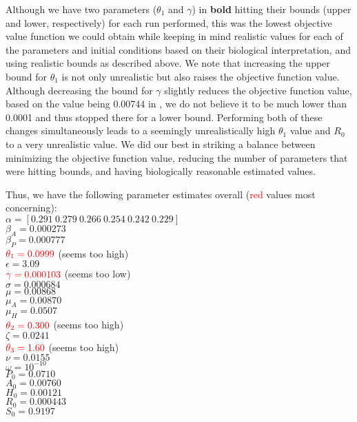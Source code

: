 \documentclass[12pt]{article}
\begin{document}
Although we have two parameters ($\theta_1$ and $\gamma$) in \textbf{bold} hitting their bounds (upper and lower, respectively) for each run performed, this was the lowest objective value function we could obtain while keeping in mind realistic values for each of the parameters and initial conditions based on their biological interpretation, and using realistic bounds as described above. We note that increasing the upper bound for $\theta_1$ is not only unrealistic but also raises the objective function value. Although decreasing the bound for $\gamma$ slightly reduces the objective function value, based on the value being 0.00744 in \cite{Battista}, we do not believe it to be much lower than 0.0001 and thus stopped there for a lower bound. Performing both of these changes simultaneously leads to a seemingly unrealistically high $\theta_1$ value and $R_0$ to a very unrealistic value. We did our best in striking a balance between minimizing the objective function value, reducing the number of parameters that were hitting bounds, and having biologically reasonable estimated values. 

Thus, we have the following parameter estimates overall (\textcolor{red}{red} values most concerning): \\
$\alpha=[0.291  \   0.279  \   0.266    \   0.254 \    0.242    \     0.229   ]$ \\
$\beta_A=0.000273$ \\
$\beta_P=0.000777$ \\
$\textcolor{red}{\theta_1=0.0999}$ (seems too high)\\
$\epsilon=3.09$ \\
$\textcolor{red}{\gamma=0.000103}$ (seems too low) \\
$\sigma=0.000684$ \\
$\mu=0.00868$ \\
$\mu_{A}=0.00870$ \\
$\mu_{H}=0.0507$ \\
$\textcolor{red}{\theta_2=0.300}$ (seems too high) \\
$\zeta=0.0241$ \\
$\textcolor{red}{\theta_3=1.60}$ (seems too high) \\
$\nu=0.0155$ \\ 
$\omega=10^{-10}$ \\ 
$P_0=0.0710$ \\
$A_0=0.00760$ \\
$H_0=0.00121$ \\
$R_0=0.000443$ \\
$S_0=0.9197$ \\
\end{document}
